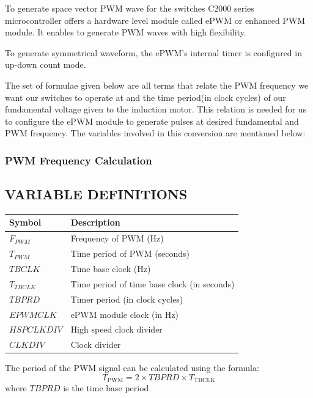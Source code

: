 To generate space vector PWM wave for the switches C2000 series microcontroller offers a hardware level module called ePWM or enhanced PWM module. It enables to generate PWM waves with high flexibility.

To generate symmetrical waveform, the ePWM's internal timer is configured in up-down count mode.


\vspace{0.2in}

The set of formulae given below are all terms that relate the PWM frequency we want our switches to operate at and the time period(in clock cycles) of our fundamental voltage given to the induction motor. This relation is needed for us to configure the ePWM module to generate pulses at desired fundamental and PWM frequency. The variables involved in this conversion are mentioned below:

\subsubsection{PWM Frequency Calculation}

\subsection*{VARIABLE DEFINITIONS}

\renewcommand{\arraystretch}{1.5}
\begin{tabular}{|>{\bfseries}l|l|}
	\hline
	Symbol      & Description                                 \\ \hline
	$F_{PWM}$   & Frequency of PWM (Hz)                       \\ \hline
	$T_{PWM}$   & Time period of PWM (seconds)                \\ \hline
	$TBCLK$     & Time base clock (Hz)                        \\ \hline
	$T_{TBCLK}$ & Time period of time base clock (in seconds) \\ \hline
	$TBPRD$     & Timer period (in clock cycles)              \\ \hline
	$EPWMCLK$   & ePWM module clock (in Hz)                   \\ \hline
	$HSPCLKDIV$ & High speed clock divider                    \\ \hline
	$CLKDIV$    & Clock divider                               \\ \hline
\end{tabular}


\vspace{0.2in}
The period of the PWM signal can be calculated using the formula:
\begin{equation}
	T_{\text{PWM}} = 2 \times TBPRD \times T_{\text{TBCLK}}
\end{equation}
where \( TBPRD \) is the time base period.

